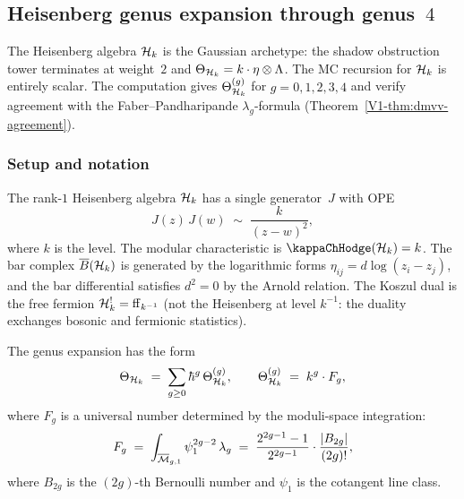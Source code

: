 %
%

\subsection{Heisenberg genus expansion through genus~$4$}

The Heisenberg algebra $\mathcal{H}_k$ is the Gaussian archetype:
the shadow obstruction tower terminates at weight~$2$ and
$\Theta_{\mathcal{H}_k} = k \cdot \eta \otimes \Lambda$. The MC
recursion for $\mathcal{H}_k$ is entirely scalar. The computation gives
$\Theta^{(g)}_{\mathcal{H}_k}$ for $g = 0, 1, 2, 3, 4$ and verify
agreement with the Faber--Pandharipande $\lambda_g$-formula
(Theorem~\ref{V1-thm:dmvv-agreement}).

\subsubsection{Setup and notation}

The rank-$1$ Heisenberg algebra $\mathcal{H}_k$ has a single generator~$J$
with OPE
\begin{equation}%
J(z)\,J(w) \;\sim\; \frac{k}{(z-w)^2},
\end{equation}
where $k$ is the level. The modular characteristic is
$\kappaChHodge(\cH_k) = k$. The bar complex $\overline{B}(\mathcal{H}_k)$ is
generated by the logarithmic forms
$\eta_{ij} = d\log(z_i - z_j)$, and the bar differential satisfies
$d^2 = 0$ by the Arnold relation. The Koszul dual is the
free fermion $\mathcal{H}_k^! = \mathrm{ff}_{k^{-1}}$ (not the
Heisenberg at level $k^{-1}$: the duality exchanges bosonic
and fermionic statistics).

The genus expansion has the form
\begin{equation}%
\Theta_{\cH_k}
\;=\;
\sum_{g \geq 0} \hbar^g\,\Theta^{(g)}_{\cH_k},
\qquad
\Theta^{(g)}_{\cH_k}
\;=\;
k^g \cdot F_g,
\end{equation}
where $F_g$ is a universal number determined by the moduli-space
integration:
\begin{equation}%
F_g
\;=\;
\int_{\overline{\cM}_{g,1}} \psi_1^{2g-2}\,\lambda_g
\;=\;
\frac{2^{2g-1} - 1}{2^{2g-1}}
\cdot
\frac{|B_{2g}|}{(2g)!},
\end{equation}
where $B_{2g}$ is the $(2g)$-th Bernoulli number and
$\psi_1$ is the cotangent line class.

